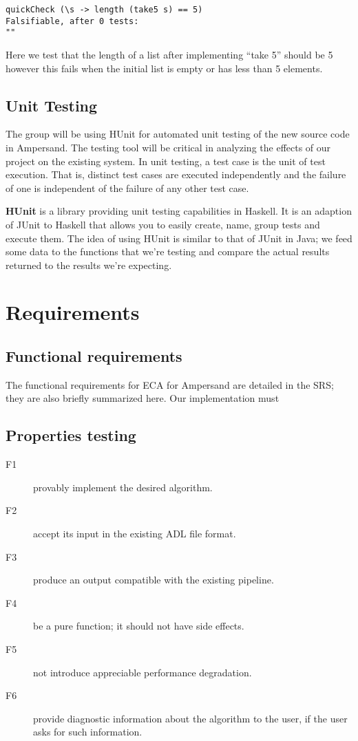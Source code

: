 \documentclass[12pt]{report}
\begin{document}
\begin{lstlisting}
quickCheck (\s -> length (take5 s) == 5)
Falsifiable, after 0 tests:
""
\end{lstlisting}

Here we test that the length of a list after implementing ``take 5'' should be 5 however this fails when the initial list is empty or has less than 5 elements.


\subsection{Unit Testing}
The group will be using HUnit for automated unit testing of the new source code in Ampersand. The testing tool will be critical in analyzing the effects of our project on the existing system.  In unit testing, a test case is the unit of test execution. That is, distinct test cases are executed independently and the failure of one is independent of the failure of any other test case.

\textbf{HUnit} is a library providing unit testing capabilities in Haskell. 
It is an adaption of JUnit to Haskell that allows you to easily create, name, group tests and execute them.
The idea of using HUnit is similar to that of JUnit in Java; we feed some data to the functions that we're testing 
and compare the actual results returned to the results we're expecting. 
\section{Requirements}
\subsection{Functional requirements}
The functional requirements for ECA for Ampersand are detailed in the SRS; they
are also briefly summarized here. Our implementation must

\subsection{Properties testing}


\begin{description}
\item[F1] provably implement the desired algorithm.
\item[F2] accept its input in the existing ADL file format.
\item[F3] produce an output compatible with the existing pipeline. 
\item[F4] be a pure function; it should not have side effects.  
\item[F5] not introduce appreciable performance degradation. 
\item[F6] provide diagnostic information about the algorithm to
the user, if the user asks for such information.
\end{description}
\end{document}
